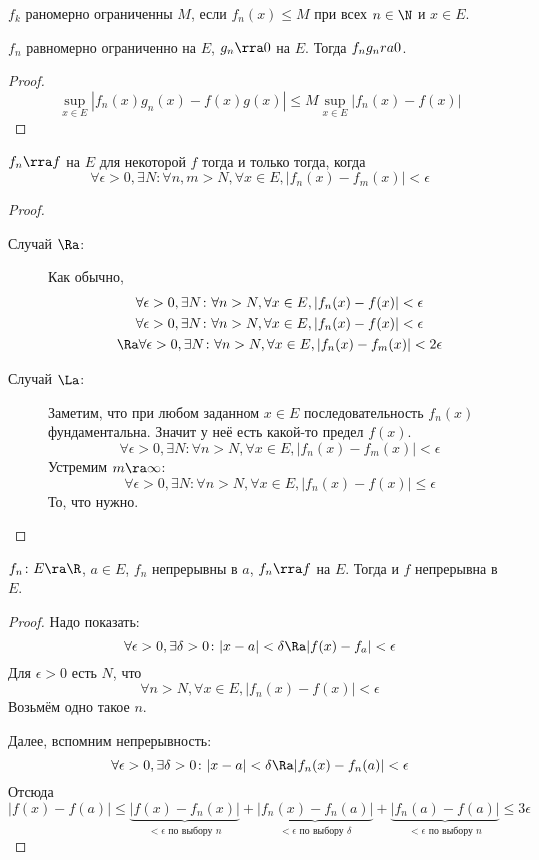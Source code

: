 \begin{Def}
	$f_k$ раномерно ограниченны $M$, если $f_n(x) \le M$ при всех $n \in \N$ и $x \in E$.
\end{Def}

\begin{theorem}
	$f_n$ равномерно ограниченно на $E$, $g_n \rra 0$ на $E$.
	Тогда $f_ng_n \\ra 0$.
\end{theorem}
\begin{proof}
	\[ \sup_{x \in E} |f_n(x)g_n(x) - f(x)g(x)| \le M \sup_{x \in E} |f_n(x) - f(x)| \]
\end{proof}

\begin{theorem}
	$f_n \rra f$ на $E$ для некоторой $f$ тогда и только тогда, когда
	\[ \forall \epsilon > 0, \exists N\colon \forall n,m > N, \forall x \in E, |f_n(x) - f_m(x)| < \epsilon \]
\end{theorem}
\begin{proof}
	\begin{description}
	\item[Случай $\Ra$:]
		Как обычно,
		\begin{gather*}
			\forall \epsilon > 0, \exists N\colon \forall n > N, \forall x \in E, |f_n(x) - f(x)| < \epsilon \\
			\forall \epsilon > 0, \exists N\colon \forall n > N, \forall x \in E, |f_n(x) - f(x)| < \epsilon \\
			\Ra \forall \epsilon > 0, \exists N\colon \forall n > N, \forall x \in E, |f_n(x) - f_m(x)| < 2\epsilon
		\end{gather*}

	\item[Случай $\La$:]
		Заметим, что при любом заданном $x \in E$ последовательность $f_n(x)$ фундаментальна.
		Значит у неё есть какой-то предел $f(x)$.
		\[
			\forall \epsilon > 0, \exists N\colon \forall n > N, \forall x \in E, |f_n(x) - f_m(x)| < \epsilon
		\]
		Устремим $m \ra \infty$:
		\[
			\forall \epsilon > 0, \exists N\colon \forall n > N, \forall x \in E, |f_n(x) - f(x)| \le \epsilon
		\]
		То, что нужно.
	\end{description}
\end{proof}

\begin{theorem}
	$f_n\colon E \ra \R$, $a \in E$, $f_n$ непрерывны в $a$, $f_n \rra f$ на $E$.
	Тогда и $f$ непрерывна в $E$.
\end{theorem}
\begin{proof}
	Надо показать:
	\[ \forall \epsilon > 0, \exists \delta > 0\colon |x - a| < \delta \Ra |f(x) - f_a| < \epsilon \]
	Для $\epsilon > 0$ есть $N$, что
	\[ \forall n > N, \forall x \in E, |f_n(x) - f(x)| < \epsilon \]
	Возьмём одно такое $n$.

	Далее, вспомним непрерывность:
	\[ \forall \epsilon > 0, \exists \delta > 0\colon |x - a| < \delta \Ra |f_n(x) - f_n(a)| < \epsilon \]
	Отсюда
	\[
		|f(x) - f(a)|
		\le \underbrace{|f(x) - f_n(x)|}_{\text{$<\epsilon$ по выбору $n$}}
		+ \underbrace{|f_n(x) - f_n(a)|}_{\text{$<\epsilon$ по выбору $\delta$}}
		+ \underbrace{|f_n(a) - f(a)|}_{\text{$<\epsilon$ по выбору $n$}}
		\le 3\epsilon
	\]
\end{proof}

